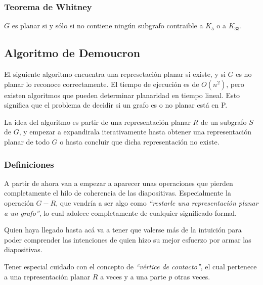 \subsubsection{Teorema de Whitney}

$G$ es planar si y s\'olo si no contiene ning\'un subgrafo contraible a $K_{5}$ o a $K_{33}$.

\subsection{Algoritmo de Demoucron}

El siguiente algoritmo encuentra una represetaci\'on planar si existe, y si $G$ es no planar lo reconoce correctamente. El tiempo de ejecuci\'on es de $O(n^2)$, pero existen algoritmos que pueden determinar planaridad en tiempo lineal. Esto significa que el problema de decidir si un grafo es o no planar est\'a en P.

La idea del algoritmo es partir de una representaci\'on planar $R$ de un subgrafo $S$ de $G$, y empezar a expandirala iterativamente hasta obtener una representaci\'on planar de todo $G$ o hasta concluir que dicha representaci\'on no existe.

\subsubsection{Definiciones}

A partir de ahora van a empezar a aparecer unas operaciones que pierden completamente el hilo de coherencia de las diapositivas. Especialmente la operaci\'on $G - R$, que vendr\'ia a ser algo como \emph{``restarle una representaci\'on planar a un grafo''}, lo cual adolece completamente de cualquier significado formal.

Quien haya llegado hasta ac\'a va a tener que valerse m\'as de la intuici\'on para poder comprender las intenciones de quien hizo su mejor esfuerzo por armar las diapositivas.

Tener especial cuidado con el concepto de \emph{``v\'ertice de contacto''}, el cual pertenece a una representaci\'on planar $R$ a veces y a una parte $p$ otras veces.


